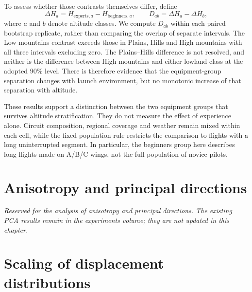 \begin{table}[htbp]
 \centering\small
 
 \caption{Experts-minus-beginners contrasts in the effective exponent, first
 pooling all altitudes and then within each class. The same bootstrap draws
 provide every contrast.}
 \label{tab:conditional-equipment}
\end{table}

To assess whether those contrasts themselves differ, define
\begin{equation}
 \Delta H_a=H_{\mathrm{experts},a}-H_{\mathrm{beginners},a},
 \qquad D_{ab}=\Delta H_a-\Delta H_b,
 \label{eq:conditional-interaction}
\end{equation}
where $a$ and $b$ denote altitude classes. We compute $D_{ab}$ within each paired
bootstrap replicate, rather than comparing the overlap of separate intervals.
The Low mountains contrast exceeds those in Plains, Hills and High mountains
with all three intervals excluding zero. The Plains--Hills difference is not
resolved, and neither is the difference between High mountains and either
lowland class at the adopted 90\% level. There is therefore evidence that the
equipment-group separation changes with launch environment, but no monotonic
increase of that separation with altitude.

These results support a distinction between the two equipment groups that survives
altitude stratification. They do not measure the effect of experience alone.
Circuit composition, regional coverage and weather remain mixed within each cell,
while the fixed-population rule restricts the comparison to flights with a long
uninterrupted segment. In particular, the beginners group here describes long
flights made on A/B/C wings, not the full population of novice pilots.
\FloatBarrier

\section{Anisotropy and principal directions}
\label{sec:fixed-anisotropy}
\emph{Reserved for the analysis of anisotropy and principal directions. The existing
PCA results remain in the experiments volume; they are not updated in this chapter.}

\section{Scaling of displacement distributions}
\label{sec:fixed-scaling}

